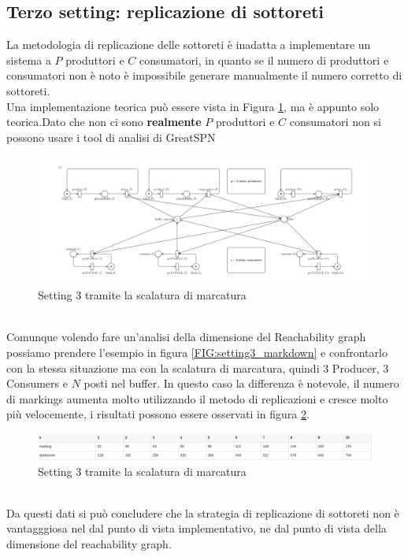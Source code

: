 \documentclass{article}
\newcommand{\greatspn}{GreatSPN}
\begin{document}
\subsection{Terzo  setting: replicazione di sottoreti}\label{SEC:terzo-replica}
La metodologia di replicazione delle sottoreti è inadatta a implementare un sistema a $P$ produttori e $C$ consumatori, in quanto se il numero di produttori e consumatori non è noto è impossibile generare manualmente il numero corretto di sottoreti.\\
Una implementazione teorica può essere vista in Figura \ref{FIG:setting3_scale}, ma è appunto solo teorica.Dato che non ci sono \textbf{realmente} $P$ produttori e $C$ consumatori non si possono usare i tool di analisi di \greatspn 
\begin{figure}[!ht]
\centering
\centerline{\includegraphics[scale=0.2]{./Esercizio2_img/setting3_scale.png}}
\caption{Setting 3 tramite la scalatura di marcatura} \label{FIG:setting3_scale}
\end{figure}\\
Comunque volendo fare un'analisi della dimensione del Reachability graph possiamo prendere l'esempio in figura \ref{FIG:setting3_markdown} e confrontarlo con la stessa situazione ma con la scalatura di marcatura, quindi 3 Producer, 3 Consumers e $N$ posti nel buffer.
In questo caso la differenza è notevole, il numero di markings aumenta molto utilizzando il metodo di replicazioni e cresce molto più velocemente, i risultati possono essere osservati in figura \ref{FIG:confronto}.\\
\begin{figure}[!ht]
\centering
\centerline{\includegraphics[scale=0.5]{./Esercizio2_img/confronto.png}}
\caption{Setting 3 tramite la scalatura di marcatura} \label{FIG:confronto}
\end{figure}\\Da questi dati si può concludere che la strategia di replicazione di sottoreti non è vantagggiosa nel dal punto di vista implementativo, ne dal punto di vista della dimensione del reachability graph.
\end{document}
